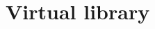 \documentclass[12pt]{article}
\begin{document}
%
%    
%
%    
%
%    

\section{Virtual library}
\label{seclibrary}

\end{document}
